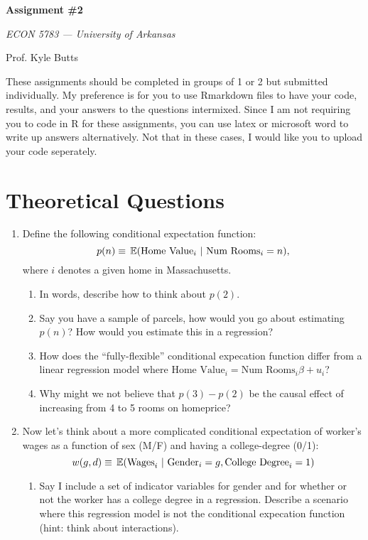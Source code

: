 \documentclass[12pt]{article}
\begin{document}
\begin{center}
  {\Huge\bf Assignment \#2}
  
  \smallskip
  {\large\it  ECON 5783 — University of Arkansas}

  \medskip
  {\large Prof. Kyle Butts}
\end{center}

These assignments should be completed in groups of 1 or 2 but submitted individually. My preference is for you to use Rmarkdown files to have your code, results, and your answers to the questions intermixed. Since I am not requiring you to code in R for these assignments, you can use latex or microsoft word to write up answers alternatively. Not that in these cases, I would like you to upload your code seperately. 

\section*{Theoretical Questions}

\begin{enumerate}
  \item Define the following conditional expectation function: $$
    p(n) \equiv \expec{\text{Home Value}_i}{\text{Num Rooms}_i = n},
  $$
  where $i$ denotes a given home in Massachusetts. 
  \begin{enumerate}
    \item In words, describe how to think about $p(2)$.
    
    \item Say you have a sample of parcels, how would you go about estimating $p(n)$? How would you estimate this in a regression?
    
    \item How does the ``fully-flexible'' conditional expecation function differ from a linear regression model where $\text{Home Value}_i = \text{Num Rooms}_i \beta + u_i$?
    
    \item Why might we not believe that $p(3) - p(2)$ be the causal effect of increasing from 4 to 5 rooms on homeprice?
  \end{enumerate}

  \item Now let's think about a more complicated conditional expectation of worker's wages as a function of sex (M/F) and having a college-degree (0/1):
  $$
    w(g, d) \equiv \expec{\text{Wages}_i}{\text{Gender}_i = g, \text{College Degree}_i = 1}
  $$
  \begin{enumerate}
    \item Say I include a set of indicator variables for gender and for whether or not the worker has a college degree in a regression. Describe a scenario where this regression model is not the conditional expecation function (hint: think about interactions).
  \end{enumerate}
\end{enumerate}
\end{document}
